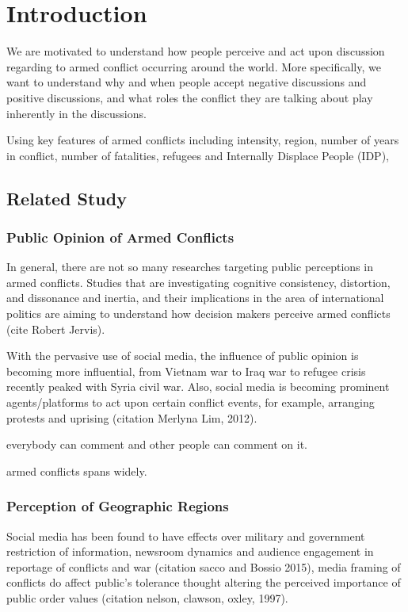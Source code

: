 



\chapter{Introduction}
We are motivated to understand how people perceive and act upon discussion regarding to armed conflict occurring around the world. More specifically, we want to understand why and when people accept negative discussions and positive discussions, and what roles the conflict they are talking about play inherently in the discussions. 

Using key features of armed conflicts including intensity, region, number of years in conflict, number of fatalities, refugees and Internally Displace People (IDP), 


\section{Related Study}
\subsection{Public Opinion of Armed Conflicts}
In general, there are not so many researches targeting public perceptions in armed conflicts. Studies that are investigating cognitive consistency, distortion, and dissonance and inertia, and their implications in the area of international politics are aiming to understand how decision makers perceive armed conflicts (cite Robert Jervis). 

With the pervasive use of social media, the influence of public opinion is becoming more influential, from Vietnam war to Iraq war to refugee crisis recently peaked with Syria civil war. Also, social media is becoming prominent agents/platforms to act upon certain conflict events, for example, arranging protests and uprising (citation Merlyna Lim, 2012).

everybody can comment and other people can comment on it.

armed conflicts spans widely.

\subsection{Perception of Geographic Regions}
Social media has been found to have effects over military and government restriction of information, newsroom dynamics and audience engagement in reportage of conflicts and war (citation sacco and Bossio 2015), media framing of conflicts do affect public's tolerance thought altering the perceived importance of public order values (citation nelson, clawson, oxley, 1997).  



